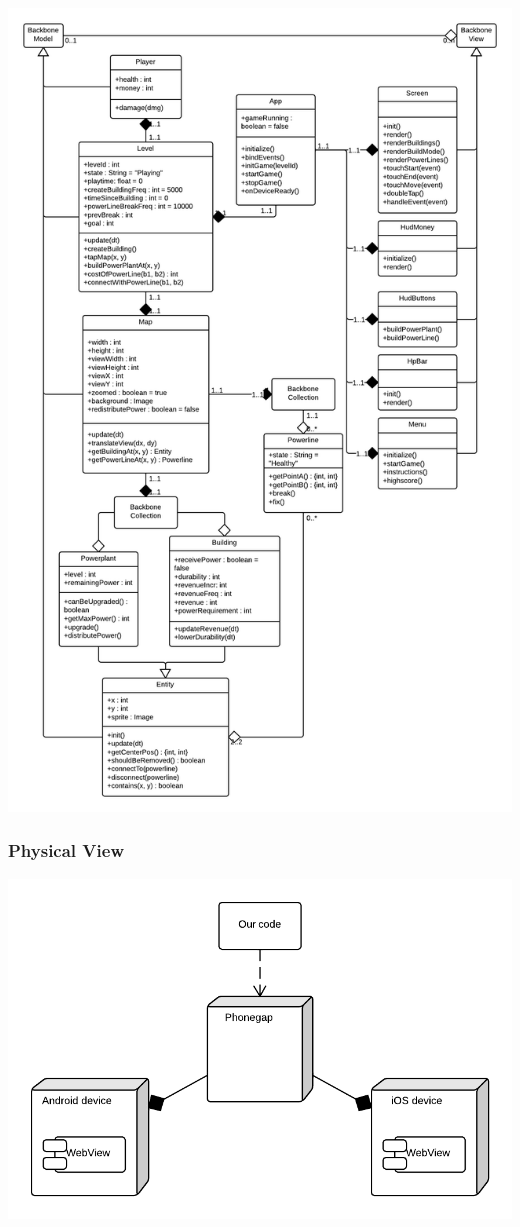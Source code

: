 \includegraphics[width=1.2\textwidth]{pictures/class_diagram}


\subsubsection{Physical View}

\includegraphics[width=\textwidth]{pictures/deployment_diagram}

